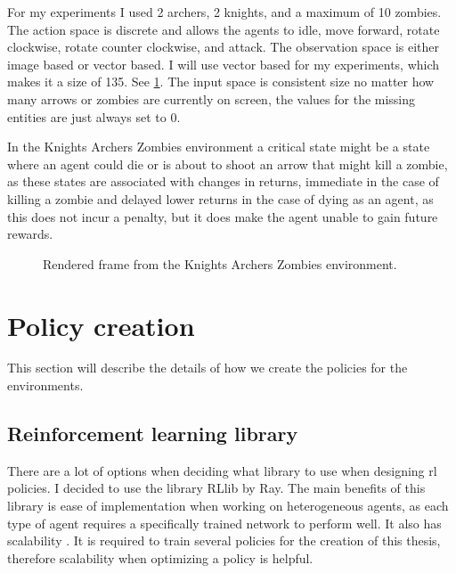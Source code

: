 \documentclass[UKenglish]{uiomasterthesis}
\begin{document}
For my experiments I used 2 archers, 2 knights, and a maximum of 10 zombies. The action space is discrete and allows the agents to idle, move forward, rotate clockwise, rotate counter clockwise, and attack. The observation space is either image based or vector based. I will use vector based for my experiments, which makes it a size of 135. See \cref{fig:kaz_env}. The input space is consistent size no matter how many arrows or zombies are currently on screen, the values for the missing entities are just always set to 0.

In the Knights Archers Zombies environment a critical state might be a state where an agent could die or is about to shoot an arrow that might kill a zombie, as these states are associated with changes in returns, immediate in the case of killing a zombie and delayed lower returns in the case of dying as an agent, as this does not incur a penalty, but it does make the agent unable to gain future rewards.

\begin{figure}[H]
    \centering
    \caption{Rendered frame from the Knights Archers Zombies environment.}
    \label{fig:kaz_env}
\end{figure}

\section{Policy creation}
This section will describe the details of how we create the policies for the environments.

\subsection{Reinforcement learning library}
There are a lot of options when deciding what library to use when designing \ac{rl} policies. I decided to use the library RLlib by Ray. The main benefits of this library is ease of implementation when working on heterogeneous agents, as each type of agent requires a specifically trained network to perform well. It also has scalability \cite{rayrllib}. It is required to train several policies for the creation of this thesis, therefore scalability when optimizing a policy is helpful.
\end{document}
